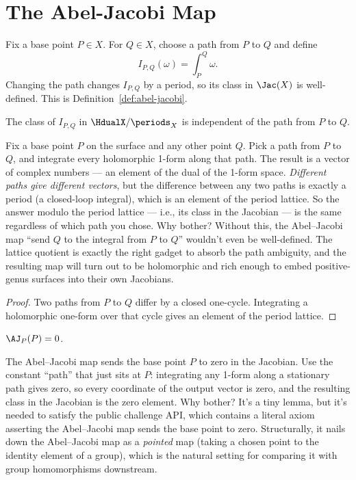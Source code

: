 \section{The Abel-Jacobi Map}
\label{sec:abel-jacobi}

Fix a base point \(P\in X\). For \(Q\in X\), choose a path from \(P\) to \(Q\)
and define
\[
  I_{P,Q}(\omega)=\int_P^Q\omega.
\]
Changing the path changes \(I_{P,Q}\) by a period, so its class in
\(\Jac(X)\) is well-defined. This is Definition~\ref{def:abel-jacobi}.

\begin{lemma}
\label{lem:aj-path-independence}
The class of \(I_{P,Q}\) in \(\HdualX/\periods_X\) is independent of the path
from \(P\) to \(Q\).
\leanok
\end{lemma}

\begin{layman}
Fix a base point \(P\) on the surface and any other point \(Q\). Pick a
path from \(P\) to \(Q\), and integrate every holomorphic 1-form along
that path. The result is a vector of complex numbers — an element of
the dual of the 1-form space. \emph{Different paths give different
vectors}, but the difference between any two paths is exactly a
period (a closed-loop integral), which is an element of the period
lattice. So the answer modulo the period lattice — i.e., its class in
the Jacobian — is the same regardless of which path you chose. Why
bother? Without this, the Abel–Jacobi map ``send \(Q\) to the integral
from \(P\) to \(Q\)'' wouldn't even be well-defined. The lattice
quotient is exactly the right gadget to absorb the path ambiguity, and
the resulting map will turn out to be holomorphic and rich enough to
embed positive-genus surfaces into their own Jacobians.
\end{layman}

\begin{proof}
\leanok
Two paths from \(P\) to \(Q\) differ by a closed one-cycle. Integrating a
holomorphic one-form over that cycle gives an element of the period lattice.
\end{proof}

\begin{lemma}
\label{lem:aj-self}
\(\AJ_P(P)=0\).
\leanok
\end{lemma}

\begin{layman}
The Abel–Jacobi map sends the base point \(P\) to zero in the Jacobian.
Use the constant ``path'' that just sits at \(P\): integrating any
1-form along a stationary path gives zero, so every coordinate of the
output vector is zero, and the resulting class in the Jacobian is the
zero element. Why bother? It's a tiny lemma, but it's needed to satisfy
the public challenge API, which contains a literal axiom asserting the
Abel–Jacobi map sends the base point to zero. Structurally, it nails
down the Abel–Jacobi map as a \emph{pointed} map (taking a chosen
point to the identity element of a group), which is the natural setting
for comparing it with group homomorphisms downstream.
\end{layman}

